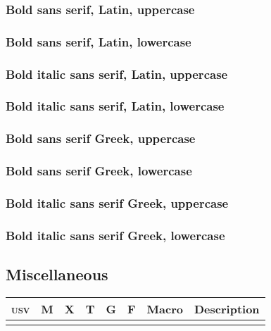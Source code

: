 \documentclass[final]{article}
\makeatletter
\def\cmd#1{\texttt{\textbackslash\expandafter\@gobble\string#1}}
\newcounter{#1}
\def\INPUT{}
\def\TABLE{%
  \par\noindent
  \begin{longtabu}[l]{@{}lccccclX[l]@{}}
    \toprule
    \textsc{usv} & M & X & T & G & F & Macro & Description \\
    \midrule \endhead
    \INPUT\\
    \bottomrule
  \end{longtabu}
}
\def\USV#1{\footnotesize\scshape\MakeLowercase{u+\@gobble#1}}
\def\CMD#1{\footnotesize\cmd#1}
\def\DESC#1{%
  \begin{spacing}{0.5}
    \RaggedRight\scriptsize #1%
  \end{spacing}
}
\def\PRINTLINE#1#2#3{
    \def\tempa{
      \USV{#1} &
      \SYMB{#2}{lm}{#1} &
      \SYMB{#2}{xits}{#1} &
      \SYMB{#2}{termes}{#1} &
      \SYMB{#2}{garamond}{#1} &
      \SYMB{#2}{fira}{#1} &
      \CMD{#2}
      \tl_if_in:NnT \PLAIN {#2}
        {
          \makebox[0pt][l]
            { \color[gray]{0.7} \textsuperscript{\sffamily (p)} }
        }
      \tl_if_in:NnT \LTXSYM {#2}
        {
          \makebox[0pt][l]
            { \color[gray]{0.7} \textsuperscript{\sffamily (l)} }
        }
      \tl_if_in:NnT \AMSSYMB {#2}
        {
          \makebox[0pt][l]
            { \color[gray]{0.7} \textsuperscript{\sffamily (a)} }
        }
      &
      \DESC{#3} \\
    }%
    \expandafter\tempa
}
\def\SYMB#1#2#3{%
  \expandafter\iffontchar\csname#2\endcsname #3\relax
    \refstepcounter{#2}%
    \mathversion{#2}%
    $\displaystyle#1$%
  \fi
}
\def\PLAIN{\alpha\beta\gamma\delta\epsilon\zeta\eta\theta\iota\kappa\lambda\mu\nu\xi\pi\rho\sigma\tau\upsilon\phi\chi\psi\omega\varepsilon\vartheta\varpi\varrho\varsigma\varphi\Gamma\Delta\Theta\Lambda\Xi\Pi\Sigma\Upsilon\Phi\Psi\Omega
%
\aleph\hbar\imath\jmath\ell\wp\Re\Im\partial\infty\prime\emptyset\nabla\surd\top\bot\angle\triangle\forall\exists\neg\flat\natural\sharp\clubsuit\diamondsuit\heartsuit\spadesuit
%
\coprod\bigvee\bigwedge\biguplus\bigcap\bigcup\int\prod\sum\bigotimes\bigoplus\bigodot\oint\bigsqcup\smallint
%
\triangleleft\triangleright\bigtriangleup\bigtriangledown\wedge\land\vee\lor\cap\cup\ddagger\dagger\sqcap\sqcup\uplus\amalg\diamond\bullet\wr\div\odot\oslash\otimes\ominus\oplus\mp\pm\circ\bigcirc\setminus\cdot\ast\times\star\propto\sqsubseteq\sqsupseteq\parallel\mid\dashv\vdash\nearrow\searrow\nwarrow\swarrow\Leftrightarrow\Leftarrow\Rightarrow\neq\ne\lnot\leq\le\geq\ge\succ\prec\approx\succeq\preceq\supset\subset\supseteq\subseteq\in\ni\owns\gg\ll\not\leftrightarrow\leftarrow\gets\rightarrow\to\mapstochar\mapsto\sim\simeq\perp\equiv\asymp\smile\frown\leftharpoonup\leftharpoondown\rightharpoonup\rightharpoondown
%
\joinrel\relbar\Relbar\lhook\hookrightarrow\rhook\hookleftarrow\bowtie\models\Longrightarrow\longrightarrow\longleftarrow\Longleftarrow\longmapsto\longleftrightarrow\Longleftrightarrow\iff
%
\ldotp\cdotp\colon\ldots\cdots\vdots\ddots
%
\acute\grave\ddot\tilde\bar\breve\check\hat\vec\dot\widetilde\widehat
%
\overrightarrow\overleftarrow\overbrace\underbrace\lmoustache\rmoustache\lgroup\rgroup\arrowvert\Arrowvert\bracevert\Vert\vert\uparrow\downarrow\updownarrow\Uparrow\Downarrow\Updownarrow\backslash\rangle\langle\rbrace\lbrace\rceil\lceil\rfloor\lfloor\sqrt}
\def\LTXSYM{
\cong
\notin
\rightleftharpoons
\doteq
\mathring
}
\def\AMSSYMB{\boxdot\boxplus\boxtimes\square\blacksquare\centerdot\lozenge\blacklozenge\circlearrowright\circlearrowleft\leftrightharpoons\boxminus\Vdash\Vvdash\vDash\twoheadrightarrow\twoheadleftarrow\leftleftarrows\rightrightarrows\upuparrows\downdownarrows\upharpoonright\restriction\downharpoonright\upharpoonleft\downharpoonleft\rightarrowtail\leftarrowtail\leftrightarrows\rightleftarrows\Lsh\Rsh\rightsquigarrow\leftrightsquigarrow\looparrowleft\looparrowright\circeq\succsim\gtrsim\gtrapprox\multimap\therefore\because\doteqdot\Doteq\triangleq\precsim\lesssim\lessapprox\eqslantless\eqslantgtr\curlyeqprec\curlyeqsucc\preccurlyeq\leqq\leqslant\lessgtr\backprime\risingdotseq\fallingdotseq\succcurlyeq\geqq\geqslant\gtrless\vartriangleright\vartriangleleft\trianglerighteq\trianglelefteq\bigstar\between\blacktriangledown\blacktriangleright\blacktriangleleft\vartriangle\blacktriangle\triangledown\eqcirc\lesseqgtr\gtreqless\lesseqqgtr\gtreqqless\Rrightarrow\Lleftarrow\veebar\barwedge\doublebarwedge\measuredangle\sphericalangle\varpropto\smallsmile\smallfrown\Subset\Supset\Cup\doublecup\Cap\doublecap\curlywedge\curlyvee\leftthreetimes\rightthreetimes\subseteqq\supseteqq\bumpeq\Bumpeq\lll\llless\ggg\gggtr\circledS\pitchfork\dotplus\backsim\backsimeq\complement\intercal\circledcirc\circledast\circleddash\lvertneqq\gvertneqq\nleq\ngeq\nless\ngtr\nprec\nsucc\lneqq\gneqq\nleqslant\ngeqslant\lneq\gneq\npreceq\nsucceq\precnsim\succnsim\lnsim\gnsim\nleqq\ngeqq\precneqq\succneqq\precnapprox\succnapprox\lnapprox\gnapprox\nsim\ncong\diagup\diagdown\varsubsetneq\varsupsetneq\nsubseteqq\nsupseteqq\subsetneqq\supsetneqq\varsubsetneqq\varsupsetneqq\subsetneq\supsetneq\nsubseteq\nsupseteq\nparallel\nmid\nshortmid\nshortparallel\nvdash\nVdash\nvDash\nVDash\ntrianglerighteq\ntrianglelefteq\ntriangleleft\ntriangleright\nleftarrow\nrightarrow\nLeftarrow\nRightarrow\nLeftrightarrow\nleftrightarrow\divideontimes\varnothing\nexists\Finv\Game\eth\eqsim\beth\gimel\daleth\lessdot\gtrdot\ltimes\rtimes\shortmid\shortparallel\smallsetminus\thicksim\thickapprox\approxeq\succapprox\precapprox\curvearrowleft\curvearrowright\digamma\varkappa\Bbbk\hslash\backepsilon}
\makeatother
\begin{document}
\subsubsection{Bold sans serif, Latin, uppercase}

\subsubsection{Bold sans serif, Latin, lowercase}

\subsubsection{Bold italic sans serif, Latin, uppercase}

\subsubsection{Bold italic sans serif, Latin, lowercase}

\subsubsection{Bold sans serif Greek, uppercase}

\subsubsection{Bold sans serif Greek, lowercase}

\subsubsection{Bold italic sans serif Greek, uppercase}

\subsubsection{Bold italic sans serif Greek, lowercase}

\subsection{Miscellaneous}
\def\UnicodeMathSymbol#1#2#3#4{\PRINTLINE{#1}{#2}{#4}}
\TABLE

\label{count:lm}
\label{count:xits}
\label{count:termes}
\label{count:garamond}
\label{count:fira}
\end{document}
